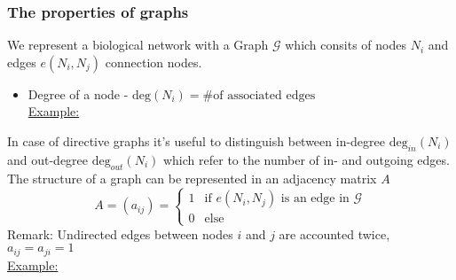 \subsubsection{The properties of graphs}
We represent a biological network with a Graph $\mathcal{G}$ which consits of nodes $N_i$ and edges $e(N_i,N_j)$ connection nodes.
\begin{itemize}[label={}]
\item Degree of a node - $\text{deg}(N_i)=\text{\# of associated edges}$\\
\underline{Example:}\\
\end{itemize}
In case of directive graphs it's useful to distinguish between in-degree $\text{deg}_{in}(N_i)$ and out-degree $\text{deg}_{out}(N_i)$ which refer to the number of in- and outgoing edges.\\
The structure of a graph can be represented in an adjacency matrix $A$
\begin{equation*}
A=(a_{ij}) = \begin{cases} 1 & \text{if } e(N_i,N_j) \text{ is an edge in }\mathcal{G}\\ 0 & \text{else}\end{cases}
\end{equation*}
Remark: Undirected edges between nodes $i$ and $j$ are accounted twice, $a_{ij}=a_{ji}=1$\\
\underline{Example:}
